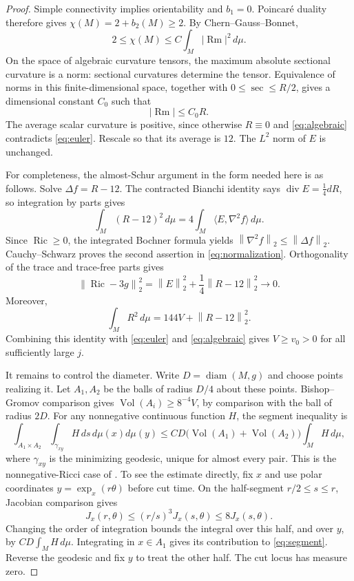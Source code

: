 \documentclass[11pt]{article}
\theoremstyle{definition}
\theoremstyle{remark}
\numberwithin{equation}{section}
\DeclareMathOperator{\Ric}{Ric}
\DeclareMathOperator{\Rm}{Rm}
\DeclareMathOperator{\Vol}{Vol}
\DeclareMathOperator{\diam}{diam}
\DeclareMathOperator{\diver}{div}
\newcommand{\dd}{\,d\mu}
\newcommand{\norm}[1]{\left\lVert #1\right\rVert}
\begin{document}
\begin{proof}
Simple connectivity implies orientability and $b_1=0$. Poincar\'e duality
therefore gives $\chi(M)=2+b_2(M)\ge2$. By Chern--Gauss--Bonnet,
\begin{equation}\label{eq:euler}
 2\le\chi(M)\le C\int_M|\Rm|^2\dd.
\end{equation}
On the space of algebraic curvature tensors, the maximum absolute
sectional curvature is a norm: sectional curvatures determine the tensor.
Equivalence of norms in this finite-dimensional space, together with
$0\le\sec\le R/2$, gives a dimensional constant $C_0$ such that
\begin{equation}\label{eq:algebraic}
 |\Rm|\le C_0R.
\end{equation}
The average scalar curvature is positive, since otherwise $R\equiv0$
and \eqref{eq:algebraic} contradicts \eqref{eq:euler}. Rescale so that
its average is $12$. The $L^2$ norm of $E$ is unchanged.

For completeness, the almost-Schur argument
\cite[Section~2.1]{DeLellisTopping} in the form needed here is as follows.
Solve $\Delta f=R-12$. The contracted Bianchi identity says
$\diver E=\tfrac14dR$, so integration by parts gives
\[
 \int_M(R-12)^2\dd=4\int_M\langle E,\nabla^2f\rangle\dd.
\]
Since $\Ric\ge0$, the integrated Bochner formula yields
$\norm{\nabla^2f}_2\le\norm{\Delta f}_2$. Cauchy--Schwarz proves the
second assertion in \eqref{eq:normalization}. Orthogonality of the trace
and trace-free parts gives
\begin{equation}\label{eq:ricci-error}
 \norm{\Ric-3g}_2^2
 =\norm E_2^2+\frac14\norm{R-12}_2^2\longrightarrow0.
\end{equation}
Moreover,
\[
 \int_MR^2\dd=144V+\norm{R-12}_2^2.
\]
Combining this identity with \eqref{eq:euler} and \eqref{eq:algebraic}
gives $V\ge v_0>0$ for all sufficiently large $j$.

It remains to control the diameter. Write $D=\diam(M,g)$ and choose
points realizing it. Let $A_1,A_2$ be the balls of radius $D/4$ about
these points. Bishop--Gromov comparison gives
$\Vol(A_i)\ge8^{-4}V$, by comparison with the ball of radius $2D$.
For any nonnegative continuous function $H$, the segment inequality is
\begin{equation}\label{eq:segment}
 \int_{A_1\times A_2}\int_{\gamma_{xy}}H\,ds\,d\mu(x)d\mu(y)
 \le CD\bigl(\Vol(A_1)+\Vol(A_2)\bigr)\int_MH\dd,
\end{equation}
where $\gamma_{xy}$ is the minimizing geodesic, unique for almost every
pair. This is the nonnegative-Ricci case of
\cite[Theorem~2.11]{CheegerColding}. To see the estimate directly, fix $x$
and use polar coordinates $y=\exp_x(r\theta)$ before cut time. On the
half-segment $r/2\le s\le r$, Jacobian comparison gives
\[
 J_x(r,\theta)\le(r/s)^3J_x(s,\theta)\le8J_x(s,\theta).
\]
Changing the order of integration bounds the integral over this half,
and over $y$, by $CD\int_MH\dd$. Integrating in $x\in A_1$ gives its
contribution to \eqref{eq:segment}. Reverse the geodesic and fix $y$
to treat the other half. The cut locus has measure zero.


\end{proof}
\end{document}
